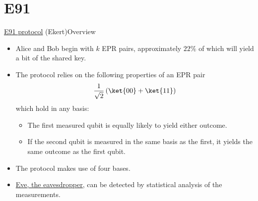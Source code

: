 \section*{E91}

\begin{frame}{\href{https://en.wikipedia.org/wiki/Quantum_key_distribution\#E91_protocol:_Artur_Ekert_(1991)}{E91 protocol} (Ekert)}{Overview}

\Vskip{-3em}\begin{itemize}[<+->]
    \item Alice and Bob begin with $k$ EPR pairs, approximately $22\%$ of which will yield a bit of the shared key.
    \item The protocol relies on the following properties of an EPR pair \[\RootTwo{}\left(\ket{00}+\ket{11}\right)\] which hold in any basis:
    \begin{itemize}
        \item The first measured qubit is equally likely to yield either outcome.
        \item If the second qubit is measured in the same basis as the first, it yields the same outcome as the first qubit.
    \end{itemize}
    \item The protocol makes use of four bases.
    \item \href{https://en.wikipedia.org/wiki/Alice_and_Bob\#Cast_of_characters}{Eve, the eavesdropper,} can be detected by statistical analysis of the measurements.
\end{itemize}

\end{frame}

